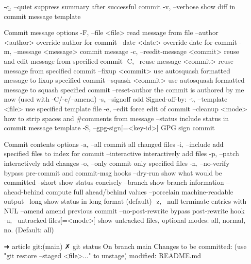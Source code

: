     -q, --quiet           suppress summary after successful commit
    -v, --verbose         show diff in commit message template

Commit message options
    -F, --file <file>     read message from file
    --author <author>     override author for commit
    --date <date>         override date for commit
    -m, --message <message>
                          commit message
    -c, --reedit-message <commit>
                          reuse and edit message from specified commit
    -C, --reuse-message <commit>
                          reuse message from specified commit
    --fixup <commit>      use autosquash formatted message to fixup specified commit
    --squash <commit>     use autosquash formatted message to squash specified commit
    --reset-author        the commit is authored by me now (used with -C/-c/--amend)
    -s, --signoff         add Signed-off-by:
    -t, --template <file>
                          use specified template file
    -e, --edit            force edit of commit
    --cleanup <mode>      how to strip spaces and #comments from message
    --status              include status in commit message template
    -S, --gpg-sign[=<key-id>]
                          GPG sign commit

Commit contents options
    -a, --all             commit all changed files
    -i, --include         add specified files to index for commit
    --interactive         interactively add files
    -p, --patch           interactively add changes
    -o, --only            commit only specified files
    -n, --no-verify       bypass pre-commit and commit-msg hooks
    --dry-run             show what would be committed
    --short               show status concisely
    --branch              show branch information
    --ahead-behind        compute full ahead/behind values
    --porcelain           machine-readable output
    --long                show status in long format (default)
    -z, --null            terminate entries with NUL
    --amend               amend previous commit
    --no-post-rewrite     bypass post-rewrite hook
    -u, --untracked-files[=<mode>]
                          show untracked files, optional modes: all, normal, no. (Default: all)

➜  article git:(main) ✗ git status
On branch main
Changes to be committed:
  (use "git restore --staged <file>..." to unstage)
	modified:   README.md

